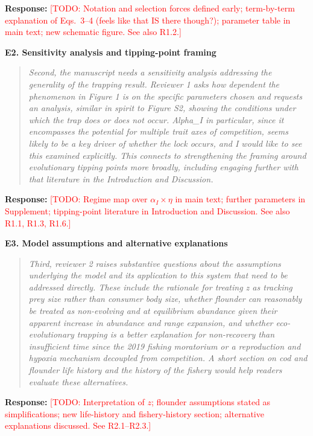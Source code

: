 \documentclass[11pt]{article}
\newenvironment{revcomment}[1]
  {\par\medskip\noindent\textbf{#1}\par\begin{quote}\itshape\color{commentgrey}}
  {\end{quote}}
\newcommand{\response}{\par\noindent\textbf{Response:} }
\newcommand{\todo}[1]{\textcolor{red}{[TODO: #1]}}
\begin{document}
\response \todo{Notation and selection forces defined early; term-by-term explanation of Eqs.~3--4 (feels like that IS there though?); parameter table in main text; new schematic figure. See also R1.2.}

\begin{revcomment}{E2. Sensitivity analysis and tipping-point framing}
Second, the manuscript needs a sensitivity analysis addressing the generality of the trapping result. Reviewer 1 asks how dependent the phenomenon in Figure 1 is on the specific parameters chosen and requests an analysis, similar in spirit to Figure S2, showing the conditions under which the trap does or does not occur. Alpha\_I in particular, since it encompasses the potential for multiple trait axes of competition, seems likely to be a key driver of whether the lock occurs, and I would like to see this examined explicitly. This connects to strengthening the framing around evolutionary tipping points more broadly, including engaging further with that literature in the Introduction and Discussion.
\end{revcomment}

\response \todo{Regime map over $\alpha_I \times \eta$ in main text; further parameters in Supplement; tipping-point literature in Introduction and Discussion. See also R1.1, R1.3, R1.6.}

\begin{revcomment}{E3. Model assumptions and alternative explanations}
Third, reviewer 2 raises substantive questions about the assumptions underlying the model and its application to this system that need to be addressed directly. These include the rationale for treating z as tracking prey size rather than consumer body size, whether flounder can reasonably be treated as non-evolving and at equilibrium abundance given their apparent increase in abundance and range expansion, and whether eco-evolutionary trapping is a better explanation for non-recovery than insufficient time since the 2019 fishing moratorium or a reproduction and hypoxia mechanism decoupled from competition. A short section on cod and flounder life history and the history of the fishery would help readers evaluate these alternatives.
\end{revcomment}

\response \todo{Interpretation of $z$; flounder assumptions stated as simplifications; new life-history and fishery-history section; alternative explanations discussed. See R2.1--R2.3.}
\end{document}

